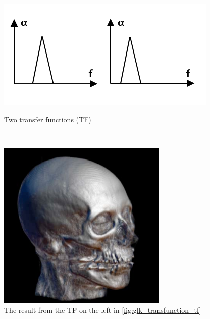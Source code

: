 \begin{figure}
        \centering
        \begin{minipage}{0.5\textwidth}
                \centering
                \includegraphics[width=1\linewidth]{images/glk_transfunction_tf.png}
                \caption{Two transfer functions (TF)}
                \label{fig:glk_transfunction_tf}
        \end{minipage}~
        \begin{minipage}{0.25\textwidth}
                \centering
                \includegraphics[width=1\linewidth]{images/glk_transfunction_1.png}
                \caption{The result from the TF on the left in \ref{fig:glk_transfunction_tf}}
                \label{fig:glk_transfunction_1}

\end{minipage}
\end{figure}
